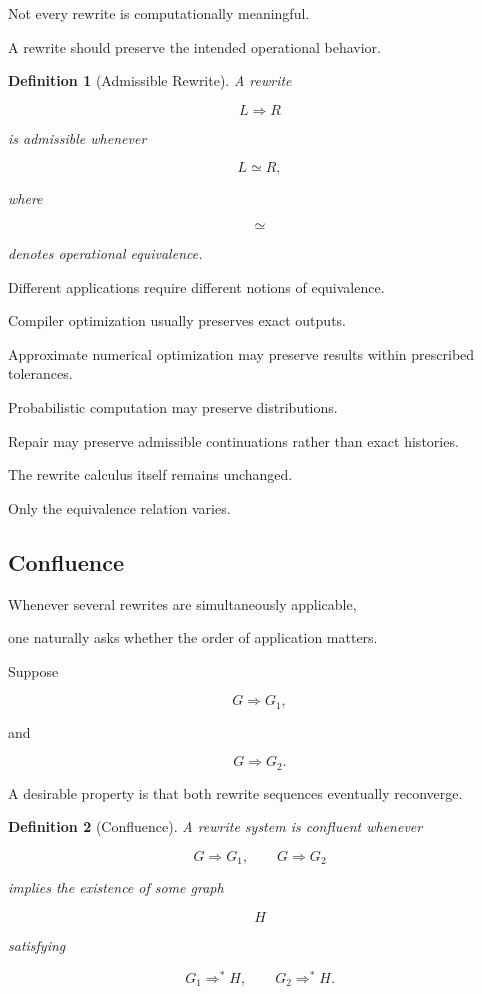 \documentclass[12pt,oneside]{article}
\newtheorem{definition}{Definition}[section]
\begin{document}
Not every rewrite is computationally meaningful.

A rewrite should preserve the intended operational behavior.

\begin{definition}[Admissible Rewrite]

A rewrite

\[
L
\Longrightarrow
R
\]

is admissible whenever

\[
L
\simeq
R,
\]

where

\[
\simeq
\]

denotes operational equivalence.

\end{definition}

Different applications require different notions of equivalence.

Compiler optimization usually preserves exact outputs.

Approximate numerical optimization may preserve results within prescribed tolerances.

Probabilistic computation may preserve distributions.

Repair may preserve admissible continuations rather than exact histories.

The rewrite calculus itself remains unchanged.

Only the equivalence relation varies.

\subsection{Confluence}

Whenever several rewrites are simultaneously applicable,

one naturally asks whether the order of application matters.

Suppose

\[
G
\Longrightarrow
G_1,
\]

and

\[
G
\Longrightarrow
G_2.
\]

A desirable property is that both rewrite sequences eventually reconverge.

\begin{definition}[Confluence]

A rewrite system is confluent whenever

\[
G
\Longrightarrow
G_1,
\qquad
G
\Longrightarrow
G_2
\]

implies the existence of some graph

\[
H
\]

satisfying

\[
G_1
\Longrightarrow^*
H,
\qquad
G_2
\Longrightarrow^*
H.
\]

\end{definition}
\end{document}
